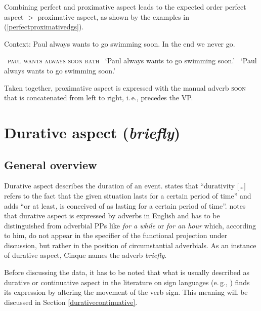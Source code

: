 \noindent Combining perfect and proximative aspect leads to the expected order perfect aspect $>$ proximative aspect, as shown by the examples in (\ref{perfectproximativedgs}).

\begin{exe}
\ex Context: Paul always wants to go swimming soon. In the end we never go. \label{perfectproximativedgs}\begin{xlist} 
\ex\textcolor{white}{*}{\textsc{paul wants always soon bath}} 
\glt \textcolor{white}{*}`Paul always wants to go swimming soon.' \label{ex:perfectproximativedgsa}
\glt \textcolor{white}{*}`Paul always wants to go swimming soon.' \label{ex:perfectproximativedgsb}
\end{xlist}
\end{exe} 

\noindent Taken together, proximative aspect is expressed with the manual adverb \textsc{soon} that is concatenated from left to right, i.\,e., precedes the VP.


\section{Durative aspect (\textit{briefly})}\label{durativeaspect}
\subsection{General overview}
Durative aspect describes the duration of an event. \citet[41]{comrie1976aspect} states that ``durativity $[$\dots $]$ refers to the fact that the given situation lasts for a certain period of time'' and adds ``or at least, is conceived of as lasting for a certain period of time''. \citet[98]{cinque1999adverbs} notes that durative aspect is expressed by adverbs in English and has to be distinguished from adverbial PPs like \textit{for a while} or \textit{for an hour} which, according to him, do not appear in the specifier of the functional projection under discussion, but rather in the position of circumstantial adverbials. As an instance of durative aspect, Cinque names the adverb \textit{briefly}. 

Before discussing the data, it has to be noted that what is usually described as durative or continuative aspect in the literature on sign languages (e.\,g., \citealt{klima1979signs, wilbur2004event, rathmann2005event, happ2014vork}) finds its expression by altering the movement of the verb sign. This meaning will be discussed in Section \ref{durativecontinuative}.

